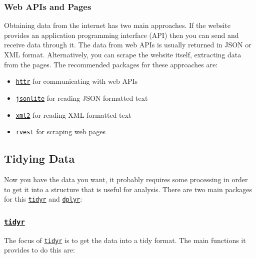 \documentclass[]{book}
\providecommand{\tightlist}{%
  \setlength{\itemsep}{0pt}\setlength{\parskip}{0pt}}
\theoremstyle{definition}
\theoremstyle{definition}
\theoremstyle{definition}
\theoremstyle{remark}
\begin{document}
\subsubsection{Web APIs and Pages}\label{web-apis-and-pages}

Obtaining data from the internet has two main approaches. If the website
provides an application programming interface (API) then you can send
and receive data through it. The data from web APIs is usually returned
in JSON or XML format. Alternatively, you can scrape the website itself,
extracting data from the pages. The recommended packages for these
approaches are:

\begin{itemize}
\tightlist
\item
  \href{http://httr.r-lib.org/}{\texttt{httr}} for communicating with
  web APIs
\item
  \href{https://www.rdocumentation.org/packages/jsonlite}{\texttt{jsonlite}}
  for reading JSON formatted text
\item
  \href{https://www.rdocumentation.org/packages/xml2}{\texttt{xml2}} for
  reading XML formatted text
\item
  \href{https://www.rdocumentation.org/packages/rvest}{\texttt{rvest}}
  for scraping web pages
\end{itemize}

\subsection{Tidying Data}\label{tidying-data}

Now you have the data you want, it probably requires some processing in
order to get it into a structure that is useful for analysis. There are
two main packages for this
\href{http://tidyr.tidyverse.org}{\texttt{tidyr}} and
\href{http://dplyr.tidyverse.org}{\texttt{dplyr}}:

\subsubsection{\texorpdfstring{\href{http://tidyr.tidyverse.org}{\texttt{tidyr}}}{tidyr}}\label{tidyr}

The focus of \href{http://tidyr.tidyverse.org}{\texttt{tidyr}} is to get
the data into a tidy format. The main functions it provides to do this
are:
\end{document}
